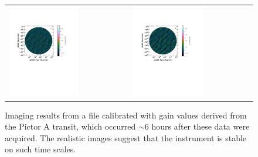 \begin{figure}
\begin{tabular}{ll}
\includegraphics[clip, trim=0.5cm 11cm 3cm 5cm, width=0.6\textwidth]{chapters/polcal/figures/47501-U-better.pdf} &
\includegraphics[clip, trim=0.5cm 11cm 3cm 5cm, width=0.6\textwidth]{chapters/polcal/figures/47501-V-better.pdf} \\
\end{tabular}
\caption[Imaging results from a file calibrated with gain values derived from the Pictor A transit, which occurred $\sim$6 hours after these data were acquired.]{Imaging results from a file calibrated with gain values derived from the Pictor A transit, which occurred $\sim$6 hours after these data were acquired. The realistic images suggest that the instrument is stable on such time scales.}
\label{fig:polcal_img_LST05}
\end{figure}

